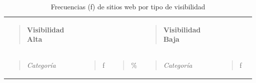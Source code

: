 \documentclass[
  spanish,
  11pt,
  a4paper,
]{scrbook}
\begin{document}
\begin{longtable}[]{@{}
  >{\raggedright\arraybackslash}p{}
  >{\raggedright\arraybackslash}p{}
  >{\raggedright\arraybackslash}p{}
  >{\raggedright\arraybackslash}p{}
  >{\raggedright\arraybackslash}p{}
  >{\raggedright\arraybackslash}p{}@{}}
\caption{Frecuencias (ƒ) de sitios web por tipo de
visibilidad}\label{tbl-3}\tabularnewline
\toprule\noalign{}
\endfirsthead
\endhead
\bottomrule\noalign{}
\endlastfoot
\begin{minipage}[t]{\linewidth}\raggedright
\begin{quote}
\textbf{Visibilidad} \textbf{Alta}
\end{quote}
\end{minipage} & & & \begin{minipage}[t]{\linewidth}\raggedright
\begin{quote}
\textbf{Visibilidad} \textbf{Baja}
\end{quote}
\end{minipage} & & \\
\begin{minipage}[t]{\linewidth}\raggedright
\begin{quote}
\emph{Categoría}
\end{quote}
\end{minipage} & \begin{minipage}[t]{\linewidth}\raggedright
\begin{quote}
ƒ
\end{quote}
\end{minipage} & \begin{minipage}[t]{\linewidth}\raggedright
\begin{quote}
\%
\end{quote}
\end{minipage} & \begin{minipage}[t]{\linewidth}\raggedright
\begin{quote}
\emph{Categoría}
\end{quote}
\end{minipage} & \begin{minipage}[t]{\linewidth}\raggedright
\begin{quote}
ƒ
\end{quote}
\end{minipage} & \begin{minipage}[t]{\linewidth}\raggedright

\end{minipage}
\end{longtable}
\end{document}
